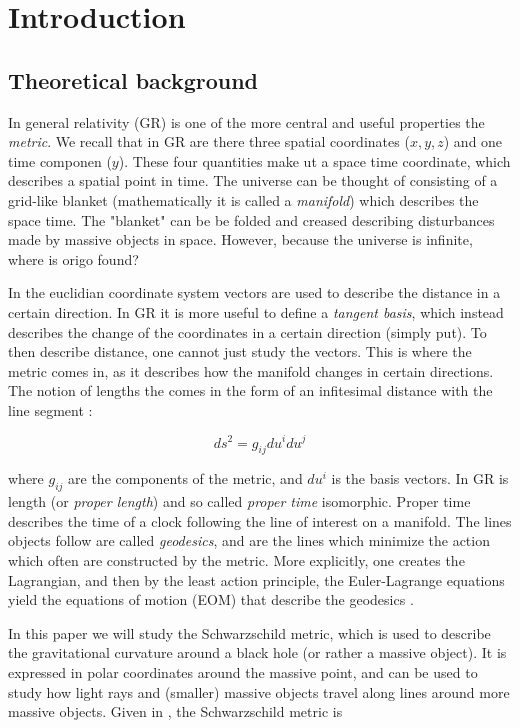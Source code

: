 \section{Introduction}\label{sec:introduction}

\subsection{Theoretical background}

In general relativity (GR) is one of the more central and useful properties the \textit{metric}. We recall that in GR are there three spatial coordinates ($x, y, z$) and one time componen ($y$). These four quantities make ut a space time coordinate, which describes a spatial point in time. The universe can be thought of consisting of a grid-like blanket (mathematically it is called a \textit{manifold}) which describes the space time. The "blanket" can be be folded and creased describing disturbances made by massive objects in space. However, because the universe is infinite, where is origo found?

In the euclidian coordinate system vectors are used to describe the distance in a certain direction. In GR it is more useful to define a \textit{tangent basis}, which instead describes the change of the coordinates in a certain direction (simply put). To then describe distance, one cannot just study the vectors. This is where the metric comes in, as it describes how the manifold changes in certain directions. The notion of lengths the comes in the form of an infitesimal distance with the line segment \cite{guidry_2019}:

\begin{equation}
	ds^2 = g_{ij} du^i du^j
\end{equation}

where $g_{ij}$ are the components of the metric, and $du^i$ is the basis vectors. In GR is length (or \textit{proper length}) and so called \textit{proper time} isomorphic. Proper time describes the time of a clock following the line of interest on a manifold. The lines objects follow are called \textit{geodesics}, and are the lines which minimize the action which often are constructed by the metric. More explicitly, one creates the Lagrangian, and then by the least action principle, the Euler-Lagrange equations yield the equations of motion (EOM) that describe the geodesics \cite{guidry_2019}. 

In this paper we will study the Schwarzschild metric, which is used to describe the gravitational curvature around a black hole (or rather a massive object). It is expressed in polar coordinates around the massive point, and can be used to study how light rays and (smaller) massive objects travel along lines around more massive objects. Given in \cite{gould_2007, guidry_2019}, the Schwarzschild metric is

